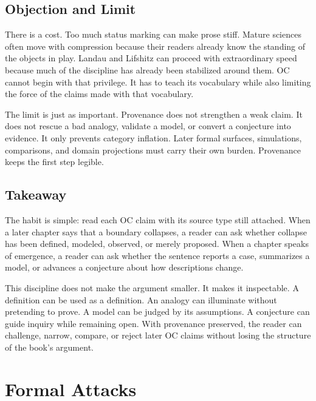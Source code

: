 \documentclass[11pt,a4paper,openany]{book}
\begin{document}
\subsection{Objection and Limit}
There is a cost. Too much status marking can make prose stiff. Mature sciences often move with compression because their readers already know the standing of the objects in play. Landau and Lifshitz can proceed with extraordinary speed because much of the discipline has already been stabilized around them. OC cannot begin with that privilege. It has to teach its vocabulary while also limiting the force of the claims made with that vocabulary. \cite{goldenfeld_lectures,kadanoff_scaling}\par
The limit is just as important. Provenance does not strengthen a weak claim. It does not rescue a bad analogy, validate a model, or convert a conjecture into evidence. It only prevents category inflation. Later formal surfaces, simulations, comparisons, and domain projections must carry their own burden. Provenance keeps the first step legible.\par
\subsection{Takeaway}
The habit is simple: read each OC claim with its source type still attached. When a later chapter says that a boundary collapses, a reader can ask whether collapse has been defined, modeled, observed, or merely proposed. When a chapter speaks of emergence, a reader can ask whether the sentence reports a case, summarizes a model, or advances a conjecture about how descriptions change. \cite{goldenfeld_lectures,kadanoff_scaling}\par
This discipline does not make the argument smaller. It makes it inspectable. A definition can be used as a definition. An analogy can illuminate without pretending to prove. A model can be judged by its assumptions. A conjecture can guide inquiry while remaining open. With provenance preserved, the reader can challenge, narrow, compare, or reject later OC claims without losing the structure of the book's argument.\par
\section{Formal Attacks}
\end{document}
